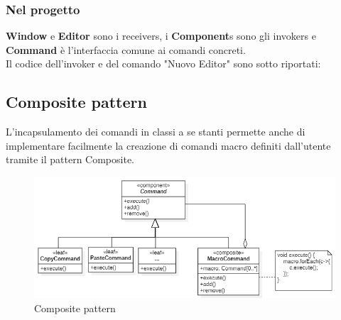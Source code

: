 \documentclass[12pt]{article}
\begin{document}
\subsubsection{Nel progetto}
\textbf{Window} e \textbf{Editor} sono i receivers, i \textbf{Component}s sono gli invokers e \textbf{Command} è l'interfaccia comune ai comandi concreti.\\
Il codice dell'invoker e del comando "Nuovo Editor" sono sotto riportati:\\
\begin{minipage}{\textwidth}

\end{minipage}
\begin{minipage}{\textwidth}

\end{minipage}
\begin{minipage}{\textwidth}

\end{minipage}
\begin{minipage}{\textwidth}

\end{minipage}

\subsection{Composite pattern}
L'incapsulamento dei comandi in classi a se stanti permette anche di implementare facilmente la creazione di comandi macro definiti dall'utente tramite il pattern Composite.
\begin{figure}[h!]
\centering
\includegraphics[scale=0.6]{compositePattern.png}
\caption{Composite pattern}
\label{fig:compositePattern}
\end{figure}
\end{document}
